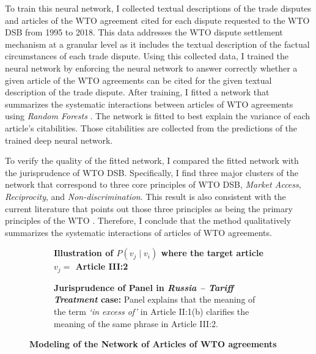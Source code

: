 To train this neural network, I collected textual descriptions of the trade disputes and articles of the WTO agreement cited for each dispute requested to the WTO DSB from 1995 to 2018. This data addresses the WTO dispute settlement mechanism at a granular level as it includes the textual description of the factual circumstances of each trade dispute. Using this collected data, I trained the neural network by enforcing the neural network to answer correctly whether a given article of the WTO agreements can be cited for the given textual description of the trade dispute. After training, I fitted a network that summarizes the systematic interactions between articles of WTO agreements using \textit{Random Forests} \citep{rf, genie3}. The network is fitted to best explain the variance of each article's citabilities. Those citabilities are collected from the predictions of the trained deep neural network.

To verify the quality of the fitted network, I compared the fitted network with the jurisprudence of WTO DSB.
Specifically, I find three major clusters of the network that correspond to three core principles of WTO DSB, \textit{Market Access}, \textit{Reciprocity}, and \textit{Non-discrimination}.
This result is also consistent with the current literature that points out those three principles as being the primary principles of the WTO \citep{bagwell1999}.
Therefore, I conclude that the method qualitatively summarizes the systematic interactions of articles of WTO agreements.

\begin{figure}[t!]
 \captionsetup[subfigure]{justification=centering}
 \begin{subfigure}[b]{1\textwidth}
     \centering{
         
     }
     \caption{\textbf{Illustration of $P(v_j \mid v_i)$ where the target article $v_j=$ Article III:2}}
     \label{subfig:a:art2b}
 \end{subfigure}
 \vfill
 \begin{subfigure}[b]{1\textwidth}
     \centering{
         
     }
     \centering
     \caption{\textbf{Jurisprudence of Panel in \textit{Russia – Tariff Treatment} case:} Panel explains that the meaning of the term \textit{`in excess of'} in Article II:1(b) clarifies the meaning of the same phrase in Article III:2.}
     \label{subfig:a:condprob}
 \end{subfigure}
 \caption{\textbf{Modeling of the Network of Articles of WTO agreements}}
 \label{fig:def-example}
\end{figure}
 
